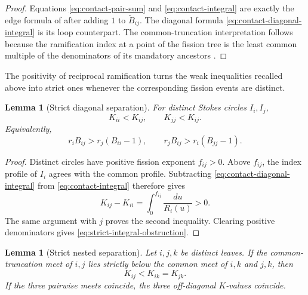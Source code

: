 \documentclass[11pt,a4paper]{amsart}
\theoremstyle{plain}
\newtheorem{lemma}[theorem]{Lemma}
\theoremstyle{definition}
\begin{document}
\begin{proof}
Equations \eqref{eq:contact-pair-sum} and \eqref{eq:contact-integral} are exactly the edge formula
of \cite[Lemma~4.3]{Doucot2025Graphs} after adding $1$ to $\widetilde B_{ij}$.  The diagonal
formula \eqref{eq:contact-diagonal-integral} is its loop counterpart.  The common-truncation
interpretation follows because the ramification index at a point of the fission tree is the least
common multiple of the denominators of its mandatory ancestors
\cite[Remark~3.19]{BoalchDoucotRembado2025}.
\end{proof}

The positivity of reciprocal ramification turns the weak inequalities recalled above into strict
ones whenever the corresponding fission events are distinct.

\begin{lemma}[Strict diagonal separation]\label{lem:strict-diagonal}
For distinct Stokes circles $I_i,I_j$,
\begin{equation}\label{eq:strict-diagonal}
 K_{ii}<K_{ij},\qquad K_{jj}<K_{ij}.
\end{equation}
Equivalently,
\begin{equation}\label{eq:strict-integral-obstruction}
 r_iB_{ij}>r_j(B_{ii}-1),\qquad r_jB_{ij}>r_i(B_{jj}-1).
\end{equation}
\end{lemma}

\begin{proof}
Distinct circles have positive fission exponent $f_{ij}>0$.  Above $f_{ij}$, the index profile of
$I_i$ agrees with the common profile.  Subtracting \eqref{eq:contact-diagonal-integral} from
\eqref{eq:contact-integral} therefore gives
\[
 K_{ij}-K_{ii}=\int_0^{f_{ij}}\frac{du}{R_i(u)}>0.
\]
The same argument with $j$ proves the second inequality.  Clearing positive denominators gives
\eqref{eq:strict-integral-obstruction}.
\end{proof}

\begin{lemma}[Strict nested separation]\label{lem:strict-nested}
Let $i,j,k$ be distinct leaves.  If the common-truncation meet of $i,j$ lies strictly below the
common meet of $i,k$ and $j,k$, then
\begin{equation}\label{eq:strict-rooted-triple}
 K_{ij}<K_{ik}=K_{jk}.
\end{equation}
If the three pairwise meets coincide, the three off-diagonal $K$-values coincide.
\end{lemma}
\end{document}
